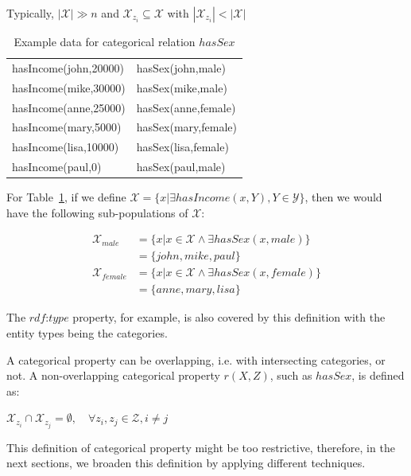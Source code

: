 Typically, $|\mathcal{X}| \gg n$ and $\mathcal{X}_{z_i} \subseteq
\mathcal{X}$ with $|\mathcal{X}_{z_i}| < |\mathcal{X}|$

\begin{table}[h!]
 \begin{center}
 \caption{Example data for categorical relation $hasSex$}
  \begin{tabular}{*{2}{l}}
    \toprule
    hasIncome(john,20000) & hasSex(john,male) 	\\
    hasIncome(mike,30000) & hasSex(mike,male) 	\\
    hasIncome(anne,25000) & hasSex(anne,female) 	\\
    hasIncome(mary,5000)  & hasSex(mary,female) 	\\
    hasIncome(lisa,10000) & hasSex(lisa,female)	\\
    hasIncome(paul,0)	  & hasSex(paul,male)	\\
    \bottomrule
  \end{tabular}
 \label{tab:cat1}
 \end{center}

\end{table}
  
For Table~\ref{tab:cat1}, if we define $\mathcal{X}=\{ x|\exists hasIncome(x,Y), Y \in \mathcal{Y} \}$, then we
would
have the following sub-populations of $\mathcal{X}$:

\begin{align*}
 \mathcal{X}_{male}&=\{ x|x \in \mathcal{X} \wedge \exists hasSex(x,male)\} \\
  &=\{john,mike,paul\} \\
\mathcal{X}_{female}&=\{ x|x \in \mathcal{X} \wedge \exists hasSex(x,female)\} \\
  &=\{anne,mary,lisa\}
\end{align*}


The $rdf$:$type$ property, for example, is also covered by this definition with the entity types being the categories.

A categorical property can be overlapping, i.e. with intersecting categories, or not. A non-overlapping categorical
property $r(X,Z)$, such as $hasSex$, is defined as:

\begin{center}
$\mathcal{X}_{z_i} \cap \mathcal{X}_{z_j} = \emptyset, \quad \forall z_i,z_j \in \mathcal{Z}, i \neq j$ 
\end{center}

This definition of categorical property might be too restrictive, therefore, in the next sections, we broaden this
definition by applying different techniques.


